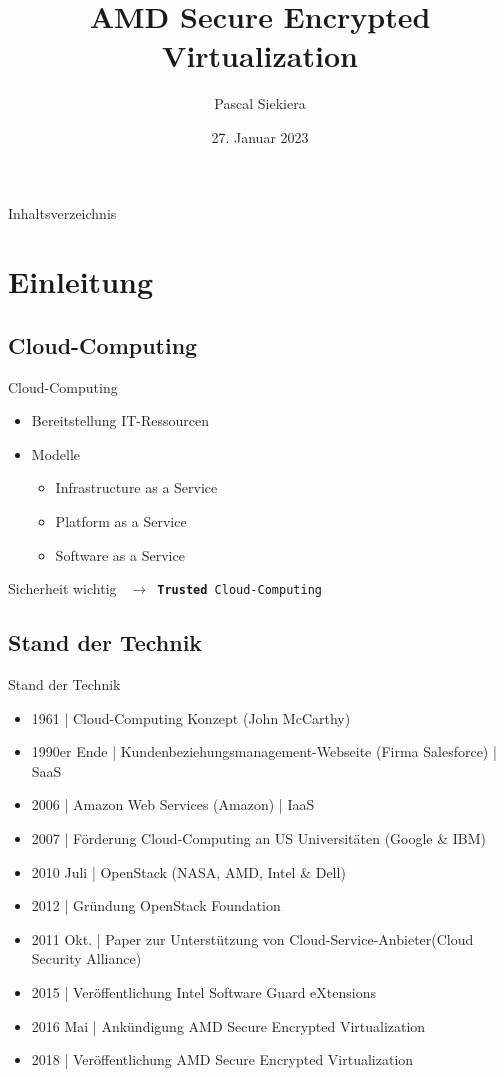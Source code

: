 \documentclass{sdqbeamer}
\title[AMD Secure Encrypted Virtualization]{AMD Secure Encrypted Virtualization}
\author[Pascal Siekiera]{Pascal Siekiera}
\date[27.\,01.\,2023]{27. Januar 2023}
\begin{document}
\KITtitleframe

\begin{frame}{Inhaltsverzeichnis}
\tableofcontents
\end{frame}


\section{Einleitung}

\subsection{Cloud-Computing}
\begin{frame}{Cloud-Computing}
	\begin{itemize}
		\item Bereitstellung IT-Ressourcen
		\item Modelle
		\begin{itemize}
			\item Infrastructure as a Service
			\item Platform as a Service
			\item Software as a Service
		\end{itemize}
	\end{itemize}

	\begin{greenblock}{Sicherheit wichtig}
		\texttt{ \(\rightarrow\) \textbf{Trusted} Cloud-Computing}
		\end{greenblock}

\end{frame}

\subsection{Stand der Technik}
\begin{frame}{Stand der Technik}
	\begin{itemize}
		\item 1961 | Cloud-Computing Konzept (John McCarthy)
		\item 1990er Ende | Kundenbeziehungsmanagement-Webseite (Firma Salesforce) | SaaS
		\item 2006 | Amazon Web Services (Amazon) | IaaS
		\item 2007 | Förderung Cloud-Computing an US Universitäten (Google \& IBM)
		\item 2010 Juli | OpenStack (NASA, AMD, Intel \& Dell)
		\item 2012 | Gründung OpenStack Foundation
		\item 2011 Okt. | Paper zur Unterstützung von Cloud-Service-Anbieter(Cloud Security Alliance)
		\item 2015 | Veröffentlichung Intel Software Guard eXtensions
		\item 2016 Mai | Ankündigung AMD Secure Encrypted Virtualization
		\item 2018 | Veröffentlichung AMD Secure Encrypted Virtualization
	\end{itemize}
\end{frame}
\end{document}
